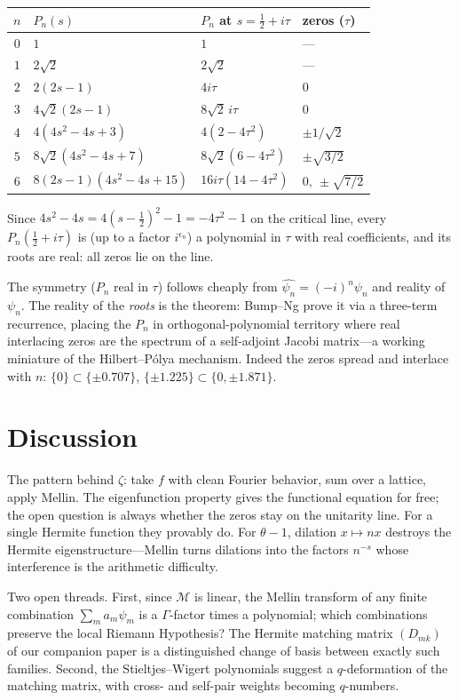 \documentclass[11pt]{article}
\theoremstyle{remark}
\newcommand{\M}{\mathcal{M}}
\begin{document}
\begin{center}
\begin{tabular}{clll}
\toprule
$n$ & $P_n(s)$ & $P_n$ at $s = \frac12 + i\tau$ & zeros ($\tau$) \\
\midrule
$0$ & $1$ & $1$ & --- \\
$1$ & $2\sqrt{2}$ & $2\sqrt{2}$ & --- \\
$2$ & $2(2s-1)$ & $4i\tau$ & $0$ \\
$3$ & $4\sqrt{2}(2s-1)$ & $8\sqrt{2}\, i\tau$ & $0$ \\
$4$ & $4(4s^2 - 4s + 3)$ & $4(2 - 4\tau^2)$ & $\pm 1/\sqrt{2}$ \\
$5$ & $8\sqrt{2}(4s^2 - 4s + 7)$ & $8\sqrt{2}(6 - 4\tau^2)$ & $\pm\sqrt{3/2}$ \\
$6$ & $8(2s-1)(4s^2 - 4s + 15)$ & $16i\tau(14 - 4\tau^2)$ & $0,\ \pm\sqrt{7/2}$ \\
\bottomrule
\end{tabular}
\end{center}

Since $4s^2 - 4s = 4(s - \tfrac12)^2 - 1 = -4\tau^2 - 1$ on the critical line, every $P_n(\tfrac12 + i\tau)$ is (up to a factor $i^{\epsilon_n}$) a polynomial in $\tau$ with real coefficients, and its roots are real: all zeros lie on the line.

The symmetry ($P_n$ real in $\tau$) follows cheaply from $\widehat{\psi_n} = (-i)^n\psi_n$ and reality of $\psi_n$. The reality of the \emph{roots} is the theorem: Bump--Ng prove it via a three-term recurrence, placing the $P_n$ in orthogonal-polynomial territory where real interlacing zeros are the spectrum of a self-adjoint Jacobi matrix---a working miniature of the Hilbert--P\'olya mechanism. Indeed the zeros spread and interlace with $n$: $\{0\} \subset \{\pm 0.707\} $, $\{\pm 1.225\} \subset \{0, \pm 1.871\}$.

\section{Discussion}

The pattern behind $\zeta$: take $f$ with clean Fourier behavior, sum over a lattice, apply Mellin. The eigenfunction property gives the functional equation for free; the open question is always whether the zeros stay on the unitarity line. For a single Hermite function they provably do. For $\theta - 1$, dilation $x \mapsto nx$ destroys the Hermite eigenstructure---Mellin turns dilations into the factors $n^{-s}$ whose interference is the arithmetic difficulty.

Two open threads. First, since $\M$ is linear, the Mellin transform of any finite combination $\sum_m a_m \psi_m$ is a $\Gamma$-factor times a polynomial; which combinations preserve the local Riemann Hypothesis? The Hermite matching matrix $(D_{mk})$ of our companion paper is a distinguished change of basis between exactly such families. Second, the Stieltjes--Wigert polynomials suggest a $q$-deformation of the matching matrix, with cross- and self-pair weights becoming $q$-numbers.
\end{document}

